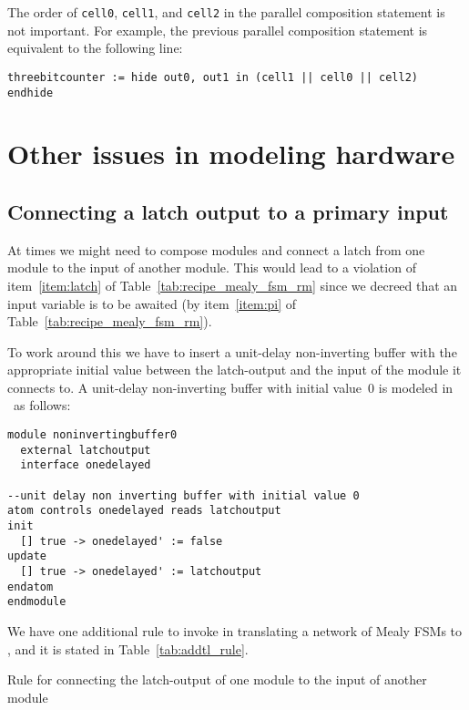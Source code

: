 The order of {\tt cell0}, {\tt cell1}, and {\tt cell2}
in the parallel composition statement is not important.
For example, the previous parallel composition statement is equivalent to the following line:

\begin{verbatim}
threebitcounter := hide out0, out1 in (cell1 || cell0 || cell2) endhide
\end{verbatim}

\section{Other issues in modeling hardware}

\subsection{Connecting a latch output to a primary input}

At times we might need to compose modules and connect a latch from one
module to the input of another module. This would lead to a violation
of item~\ref{item:latch} of Table~\ref{tab:recipe_mealy_fsm_rm} since
we decreed that an input variable is to be awaited
(by item~\ref{item:pi} of Table~\ref{tab:recipe_mealy_fsm_rm}). 

To work around this we have to insert a unit-delay non-inverting
buffer with the appropriate initial value between the latch-output and
the input of the module it connects to. A unit-delay non-inverting
buffer with initial value~$0$ is modeled in \rem\ as follows:

\begin{verbatim}
module noninvertingbuffer0
  external latchoutput
  interface onedelayed

--unit delay non inverting buffer with initial value 0 
atom controls onedelayed reads latchoutput
init 
  [] true -> onedelayed' := false
update
  [] true -> onedelayed' := latchoutput
endatom 
endmodule
\end{verbatim}

We have one additional rule to invoke in translating a network of
Mealy FSMs to \rem, and it is stated in Table~\ref{tab:addtl_rule}. 

\begin{table}
\caption{Rule for connecting the latch-output of one module to the
input of another module}
\label{tab:addtl_rule}
\end{table}


